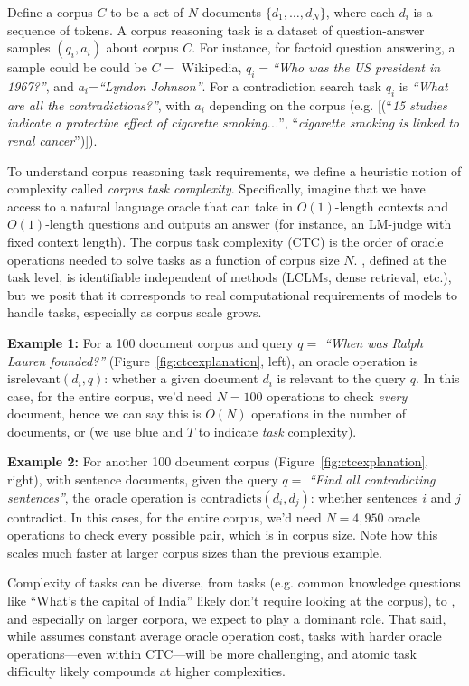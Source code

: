 Define a corpus $C$ to be a set of $N$ documents $\{d_1, \ldots, d_N\}$, where each $d_i$ is a sequence of tokens. A corpus reasoning task is a dataset of question-answer samples $(q_i, a_i)$ about corpus $C$. For instance, for factoid question answering, a sample could be could be $C=$ Wikipedia, $q_i=$\emph{``Who was the US president in 1967?''}, and $a_i$=\emph{``Lyndon Johnson''}. For a contradiction search task $q_i$ is \emph{``What are all the contradictions?''}, with $a_i$ depending on the corpus (e.g. [(``\emph{15 studies indicate a protective effect of cigarette smoking...}'', ``\emph{cigarette smoking is linked to renal cancer}'')]). 

To understand corpus reasoning task requirements, we define a heuristic notion of complexity called \emph{corpus task complexity}. Specifically, imagine that we have access to a natural language oracle that can take in $O(1)$-length contexts and $O(1)$-length questions and outputs an answer (for instance, an LM-judge with fixed context length). The corpus task complexity (CTC) is the order of oracle operations needed to solve tasks as a function of corpus size $N$. \cname, defined at the task level, is identifiable independent of methods (LCLMs, dense retrieval, etc.), but we posit that it corresponds to real computational requirements of models to handle tasks, especially as corpus scale grows.  

\textbf{Example 1: }For a 100 document corpus and query $q =$ \emph{``When was Ralph Lauren founded?''} (Figure~\ref{fig:ctcexplanation}, left), an oracle operation is $\mathrm{isrelevant}(d_i, q)$: whether a given document $d_i$ is relevant to the query $q$. In this case, for the entire corpus, we'd need $N=100$ operations to check \emph{every} document, hence we can say this is $O(N)$ operations in the number of documents, or  (we use blue and $T$ to indicate \emph{task} complexity). 

\textbf{Example 2:} For another 100 document corpus (Figure~\ref{fig:ctcexplanation}, right), with sentence documents, given the query $q =$ \emph{``Find all contradicting sentences''}, the oracle operation is $\mathrm{contradicts}(d_i, d_j)$: whether sentences $i$ and $j$ contradict. In this cases, for the entire corpus, we'd need $N=4,950$ oracle operations to check every possible pair, which is  in corpus size. Note how this scales much faster at larger corpus sizes than the previous example.

Complexity of tasks can be diverse, from  tasks (e.g. common knowledge questions like ``What's the capital of India'' likely don't require looking at the corpus), to , and especially on larger corpora, we expect \cname to play a dominant role. That said, while \cname assumes constant average oracle operation cost, tasks with harder oracle operations---even within CTC---will be more challenging, and atomic task difficulty likely compounds at higher complexities.  

